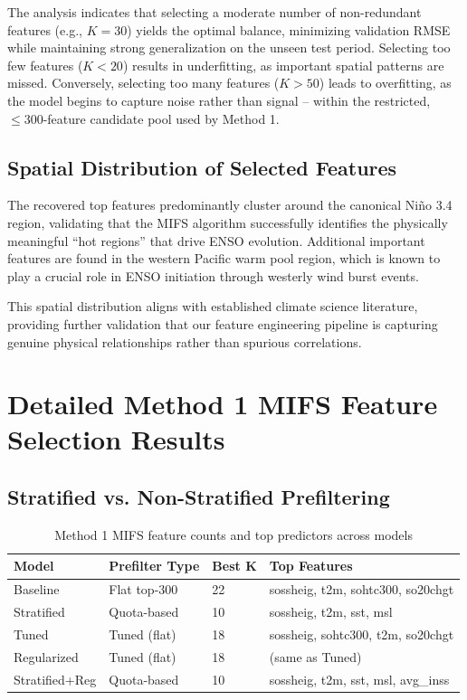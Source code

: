 The analysis indicates that selecting a moderate number of non-redundant features (e.g., $K=30$) yields the optimal balance, minimizing validation RMSE while maintaining strong generalization on the unseen test period. Selecting too few features ($K < 20$) results in underfitting, as important spatial patterns are missed. Conversely, selecting too many features ($K > 50$) leads to overfitting, as the model begins to capture noise rather than signal -- within the restricted, $\leq 300$-feature candidate pool used by Method 1.

\subsection{Spatial Distribution of Selected Features}

The recovered top features predominantly cluster around the canonical Ni\~{n}o 3.4 region, validating that the MIFS algorithm successfully identifies the physically meaningful ``hot regions'' that drive ENSO evolution. Additional important features are found in the western Pacific warm pool region, which is known to play a crucial role in ENSO initiation through westerly wind burst events.

This spatial distribution aligns with established climate science literature, providing further validation that our feature engineering pipeline is capturing genuine physical relationships rather than spurious correlations.

\section{Detailed Method 1 MIFS Feature Selection Results}

\subsection{Stratified vs. Non-Stratified Prefiltering}

\begin{table}[H]
\centering
\caption{Method 1 MIFS feature counts and top predictors across models}
\label{tab:mifs_comparison}
\normalsize
\renewcommand{\arraystretch}{1.2}
\begin{tabular}{|l|l|l|l|}
\hline
\textbf{Model} & \textbf{Prefilter Type} & \textbf{Best K} & \textbf{Top Features} \\
\hline
Baseline & Flat top-300 & 22 & sossheig, t2m, sohtc300, so20chgt \\
\hline
Stratified & Quota-based & 10 & sossheig, t2m, sst, msl \\
\hline
Tuned & Tuned (flat) & 18 & sossheig, sohtc300, t2m, so20chgt \\
\hline
Regularized & Tuned (flat) & 18 & (same as Tuned) \\
\hline
Stratified+Reg & Quota-based & 10 & sossheig, t2m, sst, msl, avg\_inss \\
\hline
\end{tabular}
\end{table}

